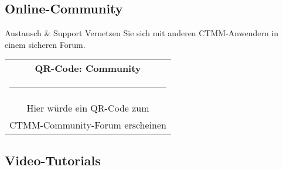 \subsection*{\textcolor{ctmmPurple}{Online-Community}}

\begin{ctmmGreenBox}{Austausch \& Support}
Vernetzen Sie sich mit anderen CTMM-Anwendern in einem sicheren Forum.

\begin{center}
\begin{tabular}{c}
\textbf{QR-Code: Community}\\
\rule{3cm}{3cm}\\
\small{Hier würde ein QR-Code zum}\\
\small{CTMM-Community-Forum erscheinen}
\end{tabular}
\end{center}
\end{ctmmGreenBox}

\subsection*{\textcolor{ctmmPurple}{Video-Tutorials}}

